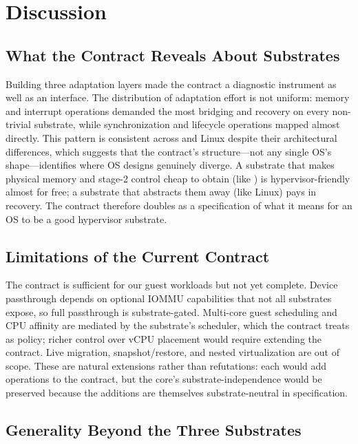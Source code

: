 \section{Discussion}

\subsection{What the Contract Reveals About Substrates}

Building three adaptation layers made the contract a diagnostic instrument as
well as an interface. The distribution of adaptation effort is not uniform:
memory and interrupt operations demanded the most bridging and recovery on every
non-trivial substrate, while synchronization and lifecycle operations mapped
almost directly. This pattern is consistent across \asterinas{} and Linux
despite their architectural differences, which suggests that the contract's
structure---not any single OS's shape---identifies where OS designs genuinely
diverge. A substrate that makes physical memory and stage-2 control cheap to
obtain (like \arceos{}) is hypervisor-friendly almost for free; a substrate that
abstracts them away (like Linux) pays in recovery. The contract therefore
doubles as a specification of what it means for an OS to be a good hypervisor
substrate.

\subsection{Limitations of the Current Contract}

The contract is sufficient for our guest workloads but not yet complete. Device
passthrough depends on optional IOMMU capabilities that not all substrates
expose, so full passthrough is substrate-gated. Multi-core guest scheduling and
CPU affinity are mediated by the substrate's scheduler, which the contract
treats as policy; richer control over vCPU placement would require extending the
contract. Live migration, snapshot/restore, and nested virtualization are out of
scope. These are natural extensions rather than refutations: each would add
operations to the contract, but the core's substrate-independence would be
preserved because the additions are themselves substrate-neutral in
specification.

\subsection{Generality Beyond the Three Substrates}

